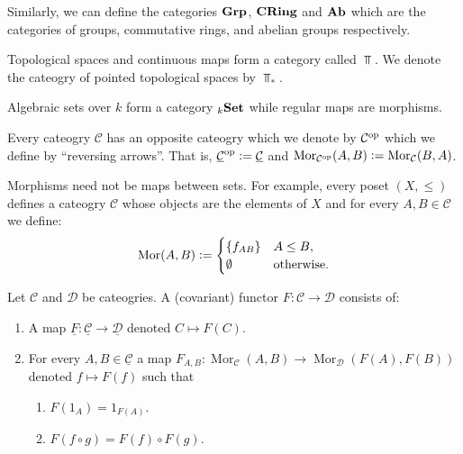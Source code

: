 \documentclass[11pt,a4paper]{article}
\DeclareMathOperator{\Mor}{Mor}
\newcommand{\cC}{\mathcal C}
\newcommand{\ucC}{\underline{\cC}}
\begin{document}
\begin{remark}
  Similarly, we can define the categories $\mathbf{Grp}$, $\mathbf{CRing}$ and $\mathbf{Ab}$
  which are the categories of groups, commutative rings, and abelian groups respectively.
\end{remark}

\begin{example}
  Topological spaces and continuous maps
  form a category called $\Top$.
  We denote the cateogry of pointed topological spaces by $\Top_*$.
\end{example}

\begin{example}
  Algebraic sets over $k$ form a category $_k \mathbf{Set}$
  while regular maps are morphisms.
\end{example}

\begin{example}
  Every cateogry $\mathcal C$ has an opposite cateogry which we denote
  by $\mathcal C^{\operatorname{op}}$ which we define by ``reversing arrows''.
  That is, $\ucC^{\op} := \ucC$ and $\Mor_{\cC^{\op}}(A,B) := \Mor_{\cC}(B,A)$.
\end{example}

\begin{remark}
  Morphisms need not be maps between sets.
  For example, every poset $(X,\le)$ defines a cateogry $\mathcal C$
  whose objects are the elements of $X$ and for every $A,B \in \mathcal C$
  we define:
  \[
    \Mor(A,B) :=
    \begin{cases}
      \set{f_{AB}} &A \le B, \\
      \emptyset &\text{otherwise}.
    \end{cases}
  \]
\end{remark}

\begin{definition}
  Let $\mathcal C$ and $\mathcal D$ be cateogries.
  A (covariant) functor $F \colon \mathcal C \to \mathcal D$ consists of:
  \begin{enumerate}
    \item[(1)] A map
      $\underline F \colon \underline{\mathcal C} \to \underline {\mathcal D}$
      denoted $C \mapsto F(C)$.
    \item[(2)] For every $A,B \in \ucC$ a map
      $F_{A,B} \colon \Mor_{\mathcal C}(A,B) \to \Mor_{\mathcal D}(F(A),F(B))$
      denoted $f \mapsto F(f)$ such that
      \begin{enumerate}
        \item[(a)] $F(1_A) = 1_{F(A)}$.
        \item[(b)] $F(f \circ g) = F(f) \circ F(g)$.
      \end{enumerate}
  \end{enumerate}
\end{definition}
\end{document}
